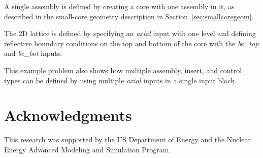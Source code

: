 \documentclass{vera-ornltm}
\begin{document}
A single assembly is defined by creating a core with one assembly in it,
as described in the small-core geometry description in Section~\ref{sec:smallcoregeom}.

The 2D lattice is defined by specifying an {\it axial} input with one level and defining
reflective boundary conditions on the top and bottom of the core with the {\it bc\_top} and {\it bc\_bot}
inputs.

This example problem also shows how multiple assembly, insert, and control types can be
defined by using multiple {\it axial} inputs in a single input block.






\section{Acknowledgments}

This research was supported by the US Department of Energy and the Nuclear Energy Advanced Modeling and Simulation Program.


\clearpage
{}
{}
\nocite{*}



\end{document}
